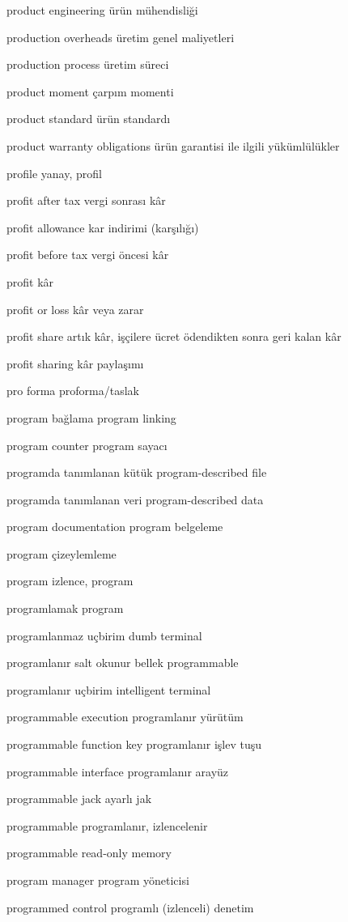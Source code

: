 \documentclass[12pt,fleqn]{article}\usepackage{../../common}
\begin{document}
product engineering ürün mühendisliği

production overheads üretim genel maliyetleri

production process üretim süreci

product moment çarpım momenti

product standard ürün standardı

product warranty obligations ürün garantisi ile ilgili yükümlülükler

profile yanay, profil

profit after tax vergi sonrası kâr

profit allowance kar indirimi (karşılığı)

profit before tax vergi öncesi kâr

profit kâr

profit or loss kâr veya zarar

profit share artık kâr, işçilere ücret ödendikten sonra geri kalan kâr

profit sharing kâr paylaşımı

pro forma proforma/taslak

program bağlama program linking

program counter program sayacı

programda tanımlanan kütük program-described file

programda tanımlanan veri program-described data

program documentation program belgeleme

program çizeylemleme

program izlence, program

programlamak program

programlanmaz uçbirim dumb terminal

programlanır salt okunur bellek programmable

programlanır uçbirim intelligent terminal

programmable execution programlanır yürütüm

programmable function key programlanır işlev tuşu

programmable interface programlanır arayüz

programmable jack ayarlı jak

programmable programlanır, izlencelenir

programmable read-only memory

program manager program yöneticisi

programmed control programlı (izlenceli) denetim
\end{document}
